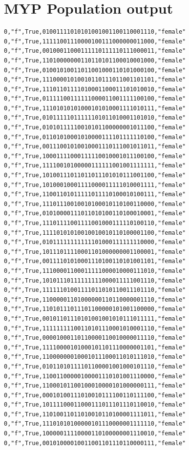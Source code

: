 \documentclass[authoryearcitations]{UoYCSproject}
\begin{document}
\section{MYP Population output}
\begin{framed}
\begin{verbatim}
0,"f",True,01001111010101001001100110001110,"female"
0,"f",True,11111001110000100111000000011000,"female"
0,"f",True,00100011000111110111110111000011,"female"
0,"f",True,11010000000110110101100010001000,"female"
0,"f",True,01001010011011001000110101000100,"female"
0,"f",True,11100001010010110111011001101101,"female"
0,"f",True,11101101111010001100011101010010,"female"
0,"f",True,01111100111111000011001111100100,"female"
0,"f",True,11101010101000101010001111010111,"female"
0,"f",True,01011111011111101011010001101010,"female"
0,"f",True,01010111110010101100000001011100,"female"
0,"f",True,01101010001010000111101111110100,"female"
0,"f",True,00111001010010001110111001011011,"female"
0,"f",True,10001111000111110010001011100100,"female"
0,"f",True,11110010100000111111001001111111,"female"
0,"f",True,10100111011011011101010111001100,"female"
0,"f",True,10100010001111000011111010001111,"female"
0,"f",True,11001101011111011110100010100111,"female"
0,"f",True,11101110010010100010110100110000,"female"
0,"f",True,01010000111011010100110100010001,"female"
0,"f",True,11101111001111001000111110100110,"female"
0,"f",True,11110101010010010010110100001100,"female"
0,"f",True,01011111111111101000111111110000,"female"
0,"f",True,10111011110001101000000001100001,"female"
0,"f",True,00111101010001110100110101001101,"female"
0,"f",True,11100001100011111000010000111010,"female"
0,"f",True,10101110111111111000011111001110,"female"
0,"f",True,11111101001111011010110011101110,"female"
0,"f",True,11000001101000000110110000001110,"female"
0,"f",True,11010111011101100000101001100000,"female"
0,"f",True,00101101110101001001010111011111,"female"
0,"f",True,11111111100110101110001010001110,"female"
0,"f",True,00001000110110000110010000011110,"female"
0,"f",True,11110000101000101101110000001101,"female"
0,"f",True,11000000010001011100011010111010,"female"
0,"f",True,01011010111101100001001000101110,"female"
0,"f",True,11001100000100001110101001110000,"female"
0,"f",True,11000101100100010000101000000111,"female"
0,"f",True,00010100111010010111100110111100,"female"
0,"f",True,10111100011000111011101110110010,"female"
0,"f",True,11010011011010010110100001111011,"female"
0,"f",True,11101010100000101110000001111110,"female"
0,"f",True,10000011110000110100000001110010,"female"
0,"f",True,00101000010011001101110110000111,"female"

\end{verbatim}
\end{framed}
\end{document}
